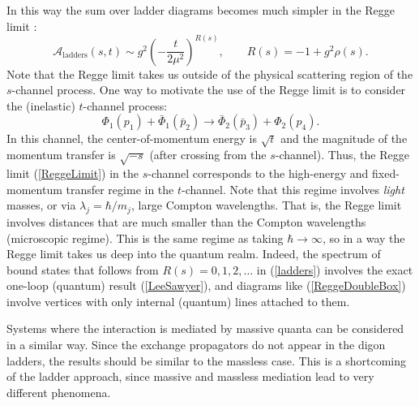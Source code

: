 In this way the sum over ladder diagrams becomes much simpler in the Regge limit \cite{LeeSawyer}:
\begin{equation}
	\mathcal{A}_{\text{ladders}}(s, t) \sim g^{2} \left(- \frac{t}{2 \mu^{2}} \right)^{R(s)}, \qquad R(s) = -1 + g^{2} \rho(s) \label{ladders}.
\end{equation}
Note that the Regge limit takes us outside of the physical scattering region of the $s$-channel process. One way to motivate the use of the Regge limit is to consider the (inelastic) $t$-channel process:
\begin{equation}
	\Phi_{1}(p_{1}) + \bar{\Phi}_{1}(\bar{p}_{2}) \longrightarrow \bar{\Phi}_{2}(\bar{p}_{3}) + \Phi_{2}(p_{4}).
\end{equation}
In this channel, the center-of-momentum energy is $\sqrt{t}$ and the magnitude of the momentum transfer is $\sqrt{-s}$ (after crossing from the $s$-channel). Thus, the Regge limit (\ref{ReggeLimit}) in the $s$-channel corresponds to the high-energy and fixed-momentum transfer regime in the $t$-channel. Note that this regime involves \textit{light} masses, or via $\lambda_{j} = \hbar / m_{j}$, large Compton wavelengths. That is, the Regge limit involves distances that are much smaller than the Compton wavelengths (microscopic regime). This is the same regime as taking $\hbar \rightarrow \infty$, so in a way the Regge limit takes us deep into the quantum realm. Indeed, the spectrum of bound states that follows from $R(s) = 0, 1, 2, \ldots$ in (\ref{ladders}) involves the exact one-loop (quantum) result (\ref{LeeSawyer}), and diagrams like (\ref{ReggeDoubleBox}) involve vertices with only internal (quantum) lines attached to them.

Systems where the interaction is mediated by massive quanta can be considered in a similar way. Since the exchange propagators do not appear in the digon ladders, the results should be similar to the massless case. This is a shortcoming of the ladder approach, since massive and massless mediation lead to very different phenomena.
